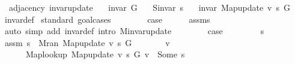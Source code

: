 \begin{isabellebody}
\isamarkupfalse%
\ {\isacharparenleft}{\kern0pt}\ adjacency{\isacharparenright}{\kern0pt}\ invar{\isacharunderscore}{\kern0pt}update{\isacharcolon}{\kern0pt}\isanewline
\ \ \ {\isachardoublequoteopen}invar\ G{\isachardoublequoteclose}\isanewline
\ \ \ {\isachardoublequoteopen}S{\isachardot}{\kern0pt}invar\ s{\isachardoublequoteclose}\isanewline
\ \ \ {\isachardoublequoteopen}invar\ {\isacharparenleft}{\kern0pt}Map{\isacharunderscore}{\kern0pt}update\ v\ s\ G{\isacharparenright}{\kern0pt}{\isachardoublequoteclose}%
\endisataginvisible
{\isafoldinvisible}%
%
\isadeliminvisible
\isanewline
%
\endisadeliminvisible
%
\isadelimproof
\ \ %
\endisadelimproof
%
\isatagproof
{}\isamarkupfalse%
\ invar{\isacharunderscore}{\kern0pt}def\isanewline
{}\isamarkupfalse%
\ {\isacharparenleft}{\kern0pt}standard{\isacharcomma}{\kern0pt}\ goal{\isacharunderscore}{\kern0pt}cases{\isacharparenright}{\kern0pt}\isanewline
\ \ \isamarkupfalse%
\ {}\isanewline
\ \ \isamarkupfalse%
\ {\isacharquery}{\kern0pt}case\isanewline
\ \ \ \ \isamarkupfalse%
\ assms{\isacharparenleft}{\kern0pt}{}{\isacharparenright}{\kern0pt}\isanewline
\ \ \ \ \isamarkupfalse%
\ {\isacharparenleft}{\kern0pt}auto\ simp\ add{\isacharcolon}{\kern0pt}\ invar{\isacharunderscore}{\kern0pt}def\ intro{\isacharcolon}{\kern0pt}\ M{\isachardot}{\kern0pt}invar{\isacharunderscore}{\kern0pt}update{\isacharparenright}{\kern0pt}\isanewline
{}\isamarkupfalse%
\isanewline
\ \ \isamarkupfalse%
\ {}\isanewline
\ \ \isamarkupfalse%
\ {\isacharquery}{\kern0pt}case\isanewline
\ \ \isamarkupfalse%
\isanewline
\ \ \ \ \isamarkupfalse%
\ s{\isacharprime}{\kern0pt}\isanewline
\ \ \ \ \isamarkupfalse%
\ assm{\isacharcolon}{\kern0pt}\ {\isachardoublequoteopen}s{\isacharprime}{\kern0pt}\ {\isasymin}\ M{\isachardot}{\kern0pt}ran\ {\isacharparenleft}{\kern0pt}Map{\isacharunderscore}{\kern0pt}update\ v\ s\ G{\isacharparenright}{\kern0pt}{\isachardoublequoteclose}\isanewline
\ \ \ \ \isamarkupfalse%
\ \isamarkupfalse%
\ v{\isacharprime}{\kern0pt}\ \isanewline
\ \ \ \ \ \ {\isachardoublequoteopen}Map{\isacharunderscore}{\kern0pt}lookup\ {\isacharparenleft}{\kern0pt}Map{\isacharunderscore}{\kern0pt}update\ v\ s\ G{\isacharparenright}{\kern0pt}\ v{\isacharprime}{\kern0pt}\ {\isacharequal}{\kern0pt}\ Some\ s{\isacharprime}{\kern0pt}{\isachardoublequoteclose}\isanewline

\end{isabellebody}
